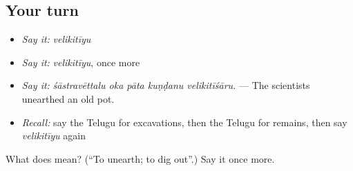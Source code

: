 \subsection*{Your turn}
\begin{itemize}
\raggedright
  \item \emph{Say it:} \emph{velikitīyu}
  \item \emph{Say it:} \emph{velikitīyu}, once more
  \item \emph{Say it:} \emph{śāstravēttalu oka pāta kuṇḍanu velikitīśāru.} — The scientists unearthed an old pot.
  \item \emph{Recall:} say the Telugu for excavations, then the Telugu for remains, then say \emph{velikitīyu} again
\end{itemize}

\begin{tcolorbox}[breakable,colback=teal!4,colframe=teal!35!black,title={Before you move on}]
What does  mean? (\textquotedblleft{}To unearth; to dig out\textquotedblright{}.) Say it once more.
\end{tcolorbox}
